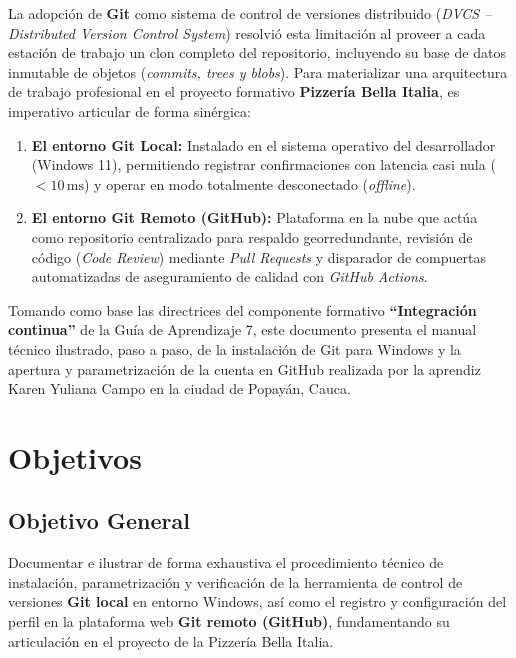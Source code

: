 \documentclass[11pt,a4paper]{article}
\begin{document}
La adopción de \textbf{Git} como sistema de control de versiones distribuido (\textit{DVCS -- Distributed Version Control System}) resolvió esta limitación al proveer a cada estación de trabajo un clon completo del repositorio, incluyendo su base de datos inmutable de objetos (\textit{commits, trees y blobs}). Para materializar una arquitectura de trabajo profesional en el proyecto formativo \textbf{Pizzería Bella Italia}, es imperativo articular de forma sinérgica:
\begin{enumerate}[label=\alph*)]
    \item \textbf{El entorno Git Local:} Instalado en el sistema operativo del desarrollador (Windows 11), permitiendo registrar confirmaciones con latencia casi nula ($<10\,\text{ms}$) y operar en modo totalmente desconectado (\textit{offline}).
    \item \textbf{El entorno Git Remoto (GitHub):} Plataforma en la nube que actúa como repositorio centralizado para respaldo georredundante, revisión de código (\textit{Code Review}) mediante \textit{Pull Requests} y disparador de compuertas automatizadas de aseguramiento de calidad con \textit{GitHub Actions}.
\end{enumerate}

Tomando como base las directrices del componente formativo \textbf{``Integración continua''} de la Guía de Aprendizaje 7, este documento presenta el manual técnico ilustrado, paso a paso, de la instalación de Git para Windows y la apertura y parametrización de la cuenta en GitHub realizada por la aprendiz Karen Yuliana Campo en la ciudad de Popayán, Cauca.

\section{Objetivos}

\subsection{Objetivo General}
Documentar e ilustrar de forma exhaustiva el procedimiento técnico de instalación, parametrización y verificación de la herramienta de control de versiones \textbf{Git local} en entorno Windows, así como el registro y configuración del perfil en la plataforma web \textbf{Git remoto (GitHub)}, fundamentando su articulación en el proyecto de la Pizzería Bella Italia.
\end{document}

